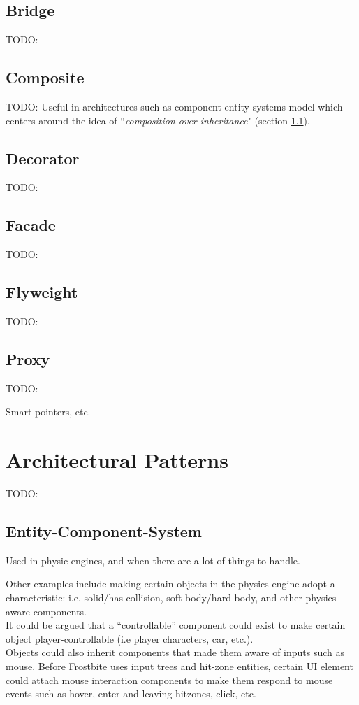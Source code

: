 \documentclass[10pt,letterpaper]{article}
\newcommand{\bs}{\bigskip}
\begin{document}
\begin{multicols}{2}
\subsection{Bridge}
TODO:

\subsection{Composite}
TODO:
Useful in architectures such as component-entity-systems model which centers around the idea of ``\textit{composition over inheritance}" (section \ref{ssection:ecs}).


\subsection{Decorator}
TODO:

\subsection{Facade}
TODO:

\subsection{Flyweight}
TODO:

\subsection{Proxy}
TODO:

Smart pointers, etc.

\section{Architectural Patterns}

TODO:

\subsection{Entity-Component-System}\label{ssection:ecs}

Used in physic engines, and when there are a lot of things to handle.


Other examples include making certain objects in the physics engine adopt a characteristic: i.e. solid/has collision, soft body/hard body, and other physics-aware components.\bs
\\
It could be argued that a ``controllable'' component could exist to make certain object player-controllable (i.e player characters, car, etc.).\bs
\\
Objects could also inherit components that made them aware of inputs such as mouse. Before Frostbite uses input trees and hit-zone entities, certain UI element could attach mouse interaction components to make them respond to mouse events such as hover, enter and leaving hitzones, click, etc.\bs
\\



\end{multicols}
\end{document}
